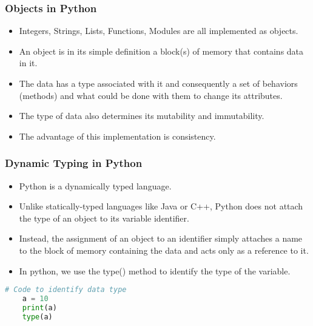 \documentclass{beamer}
\begin{document}
\begin{frame}
\frametitle{Objects in Python}
\begin{itemize}
\item Integers, Strings, Lists, Functions, Modules are all implemented as objects. 
\item An object is in its simple definition a  block(s) of memory that contains data in it.
\item The data has a type associated with it and consequently a set of behaviors (methods) and what could be done with them to change its attributes.
\item The type of data also determines its mutability and immutability.
\item The advantage of this implementation is consistency.
\end{itemize}
\end{frame}

\begin{frame}[fragile]
\frametitle{Dynamic Typing in Python}
\begin{itemize}
\item Python is a dynamically typed language.
\item Unlike statically-typed languages like Java or C++, Python does not attach the type of an object to its variable identifier.
\item Instead, the assignment of an object to an identifier simply attaches a name to the block of memory containing the data and acts only as a reference to it. 
\item In python, we use the type() method to identify the type of the variable.
\end{itemize}
\begin{lstlisting}[language=Python, keywordstyle=\color{blue}]
	# Code to identify data type
	a = 10
	print(a)
	type(a)


\end{lstlisting}
\end{frame}
\end{document}
